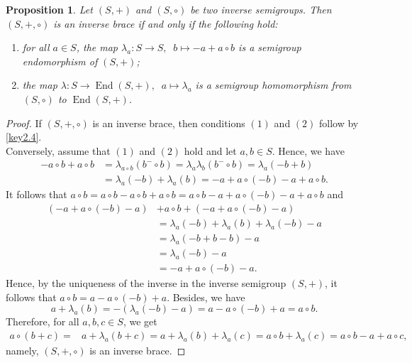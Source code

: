 \documentclass[preprint,1p]{elsarticle}
\newtheorem{prop}[theor]{Proposition}
\theoremstyle{definition}               %
\DeclareMathOperator{\End}{End}
\begin{document}
\begin{prop}\label{prop_homo_lambda}
     Let $(S, +)$ and $(S, \circ)$ be two inverse semigroups. Then $(S, +, \circ)$ is an inverse brace if and only if the following hold:
    \begin{enumerate}
       \item[\rm{(1)}] for all $a \in S$, the map $\lambda_a: S \rightarrow S, \;\; b \mapsto -a + a \circ b$ is a semigroup endomorphism of $(S, +)$;
       \item[\rm{(2)}] the map $\lambda: S \rightarrow \End(S, +), \;\; a \mapsto \lambda_a$ is a semigroup homomorphism from $(S, \circ)$ to $\End(S, +)$.
    \end{enumerate}
\end{prop}
\begin{proof}
    If $(S, +, \circ)$ is an inverse brace, then conditions $(1)$ and $(2)$ follow by \cref{key2.4}.\\ Conversely, assume that $(1)$ and $(2)$ hold and let $a, b \in S$. Hence, we have
    \begin{align*}
    -a\circ b+a\circ b&=\lambda_{a\circ b}\left(b^- \circ b\right)=\lambda_a\lambda_b\left(b^- \circ b\right)=\lambda_a(-b+b)\\
    &=\lambda_a(-b)+\lambda_a(b)=-a+a\circ (-b)-a+a\circ b.
    \end{align*}
   It follows that
    $a\circ b=a\circ b-a\circ b+a\circ b=a\circ b-a+a\circ (-b)-a+a\circ b$ and
    \begin{align*}
    (-a+ a\circ (-b)-a)&+a\circ b+(-a+a\circ (-b)-a)\\
    &=\lambda_a(-b)+\lambda_a(b)+\lambda_a(-b)-a\\
    &=\lambda_a(-b+b-b)-a\\
    &=\lambda_a(-b)-a\\
    &=-a+a\circ (-b)-a.
    \end{align*}
    Hence, by the uniqueness of the inverse in the inverse semigroup $(S,+)$, it follows that $a\circ b=a-a\circ(-b)+a.$
    Besides, we have
   $$a+\lambda_a(b) =-\left(\lambda_a(-b)-a\right)= a-a\circ (-b)+a=a\circ b.$$
Therefore, for all $a,b, c \in S$, we get
    \begin{align*}
        a\circ(b+c)=&a+\lambda_a(b+c)= a+\lambda_a(b)+\lambda_a(c)= a\circ b + \lambda_a(c)= a\circ b-a+a\circ c,
        \end{align*}
       namely, $(S, +, \circ)$ is an inverse brace.
\end{proof}

\smallskip
\end{document}
